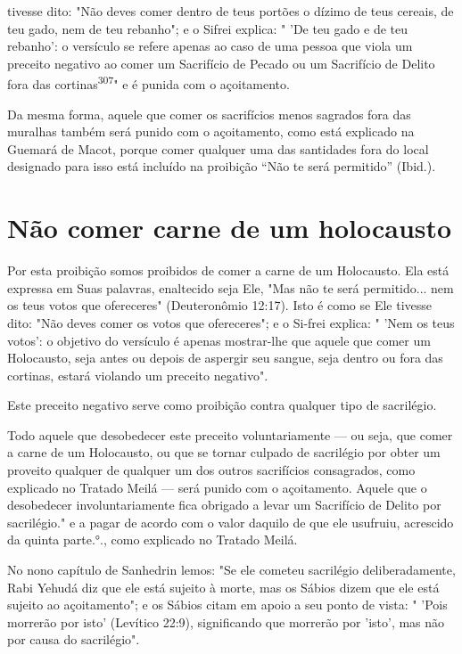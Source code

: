 tivesse dito: "Não deves comer dentro de teus portões o dízimo de teus
ce­reais, de teu gado, nem de teu rebanho"; e o Sifrei explica: " 'De
teu gado e de teu rebanho': o versículo se refere apenas ao caso de uma
pessoa que viola um preceito negativo ao comer um Sacrifício de Pecado
ou um Sacrifício de Delito fora das cortinas\textsuperscript{307}" e é
punida com o açoitamento.

Da mesma forma, aquele que comer os sacrifícios menos sagrados fora das
muralhas também será punido com o açoitamento, como está explica­do na
Guemará de Macot, porque comer qualquer uma das santidades fora do local
designado para isso está incluído na proibição ``Não te será permitido''
(Ibid.).

\section{Não comer carne de um holocausto}

Por esta proibição somos proibidos de comer a carne de um Holo­causto.
Ela está expressa em Suas palavras, enaltecido seja Ele, "Mas não te
será permitido... nem os teus votos que ofereceres" (Deuteronômio
12:17). Isto é como se Ele tivesse dito: "Não deves comer os votos que
ofereceres"; e o Si-frei explica: " 'Nem os teus votos': o objetivo do
versículo é apenas mostrar-lhe que aquele que comer um Holocausto, seja
antes ou depois de aspergir seu sangue, seja dentro ou fora das
cortinas, estará violando um preceito negativo".

Este preceito negativo serve como proibição contra qualquer tipo de
sacrilégio.

Todo aquele que desobedecer este preceito voluntariamente --- ou seja,
que comer a carne de um Holocausto, ou que se tornar culpado de
sacrilé­gio por obter um proveito qualquer de qualquer um dos outros
sacrifícios con­sagrados, como explicado no Tratado Meilá --- será
punido com o açoitamento. Aquele que o desobedecer involuntariamente
fica obrigado a levar um Sacrifí­cio de Delito por
sacrilégio." e a pagar de acordo com o valor daquilo
de que ele usufruiu, acrescido da quinta
parte.°., como explicado no Tratado
Meilá.

No nono capítulo de Sanhedrin lemos: "Se ele cometeu sacrilégio
deliberadamente, Rabi Yehudá diz que ele está sujeito à morte, mas os
Sábios dizem que ele está sujeito ao açoitamento"; e os Sábios citam em
apoio a seu ponto de vista: " 'Pois morrerão por isto' (Levítico 22:9),
significando que mor­rerão por 'isto', mas não por causa do sacrilégio".


